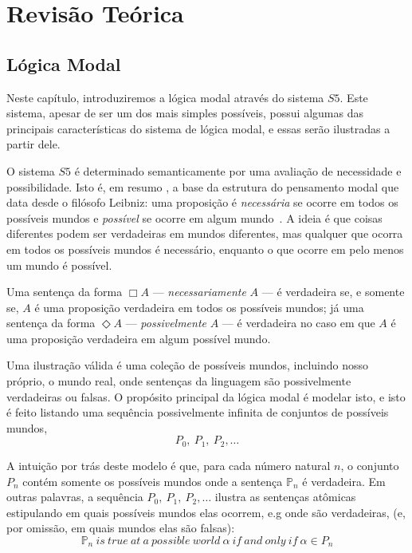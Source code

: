 \chapter{Revisão Teórica}
\section{Lógica Modal}
\label{sec:l_gica_modal}
Neste capítulo, introduziremos a lógica modal através do sistema $S5$. Este
sistema, apesar de ser um dos mais simples possíveis, possui algumas das
principais características do sistema de lógica modal, e essas serão ilustradas
a partir dele. 

O sistema $S5$ é determinado semanticamente por uma avaliação de necessidade e
possibilidade.
Isto é, em resumo %
, a base da estrutura do pensamento modal que data desde o filósofo Leibniz: uma
proposição é \textit{necessária} se ocorre em todos os possíveis mundos 
e \textit{possível} se ocorre em algum mundo~\cite{chellas:modal_logic}.
A ideia é que coisas %
diferentes podem ser verdadeiras em mundos diferentes, mas qualquer que ocorra
em todos os possíveis mundos é necessário, enquanto o que ocorre em pelo menos
um mundo é possível.


Uma sentença da forma $\Box A$ --- \textit{necessariamente} $A$ --- é verdadeira se,
e somente se, $A$ é uma proposição verdadeira em todos os possíveis mundos; já
uma sentença da forma $\Diamond A$ --- \textit{possivelmente} $A$ --- é verdadeira
no caso em que $A$ é uma proposição verdadeira em algum possível mundo.

Uma ilustração válida é uma coleção de possíveis mundos, incluindo nosso
próprio, o mundo real, onde sentenças da linguagem são possivelmente verdadeiras
ou falsas. O propósito principal da lógica modal é modelar isto, e isto é feito
listando uma sequência possivelmente infinita de conjuntos de possíveis mundos,
\begin{equation}
    P_0,\ P_1,\ P_2,\ldots
\end{equation}

A intuição por trás deste modelo é que, para cada número natural $n$, o conjunto
$P_n$ contém somente os possíveis mundos onde a sentença $\mathbb{P}_n$ é
verdadeira. Em outras palavras, a sequência 
$P_0,\ P_1,\ P_2,\ldots$
ilustra as sentenças atômicas estipulando em quais possíveis mundos elas
ocorrem, e.g onde são verdadeiras,
(e, por omissão, em quais mundos elas são falsas):
\begin{equation}
    \mathbb{P}_n\ is\ true\ at\ a\ possible\ world\ \alpha\ if\ and\ only\ if\
    \alpha \in P_n 
\end{equation}

